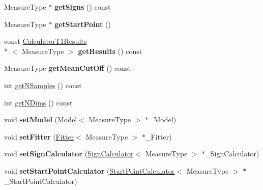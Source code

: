 \begin{DoxyCompactItemize}
\item 
\hypertarget{class_ox_1_1_calculator_ac05783e37c8e6f3f457778ebbfa2e6a5}{Measure\-Type $\ast$ {\bfseries get\-Signs} () const }\label{class_ox_1_1_calculator_ac05783e37c8e6f3f457778ebbfa2e6a5}

\item 
\hypertarget{class_ox_1_1_calculator_aebf55897e1f11cdd3afec75d24c8ea13}{Measure\-Type $\ast$ {\bfseries get\-Start\-Point} ()}\label{class_ox_1_1_calculator_aebf55897e1f11cdd3afec75d24c8ea13}

\item 
\hypertarget{class_ox_1_1_calculator_a98d3b018916c58f01f200085f20c219f}{const \hyperlink{struct_ox_1_1_calculator_t1_results}{Calculator\-T1\-Results}\\*
$<$ Measure\-Type $>$ {\bfseries get\-Results} () const }\label{class_ox_1_1_calculator_a98d3b018916c58f01f200085f20c219f}

\item 
\hypertarget{class_ox_1_1_calculator_a8232921e636ebc91a102bc2e95596a7b}{Measure\-Type {\bfseries get\-Mean\-Cut\-Off} () const }\label{class_ox_1_1_calculator_a8232921e636ebc91a102bc2e95596a7b}

\item 
int \hyperlink{class_ox_1_1_calculator_a5e5b6e1af84b8713c833a25d7c0dd90d}{get\-N\-Samples} () const 
\item 
int \hyperlink{class_ox_1_1_calculator_a3a4266dedca7e02707e732a312b85048}{get\-N\-Dims} () const 
\item 
\hypertarget{class_ox_1_1_calculator_ab814b8876ab6ddd7585f73dd23024624}{void {\bfseries set\-Model} (\hyperlink{class_ox_1_1_model}{Model}$<$ Measure\-Type $>$ $\ast$\-\_\-\-Model)}\label{class_ox_1_1_calculator_ab814b8876ab6ddd7585f73dd23024624}

\item 
\hypertarget{class_ox_1_1_calculator_a65d901e63b2f59b77a7dea82eaaa8215}{void {\bfseries set\-Fitter} (\hyperlink{class_ox_1_1_fitter}{Fitter}$<$ Measure\-Type $>$ $\ast$\-\_\-\-Fitter)}\label{class_ox_1_1_calculator_a65d901e63b2f59b77a7dea82eaaa8215}

\item 
\hypertarget{class_ox_1_1_calculator_a9b29545ec9a0e911217f496f7d539471}{void {\bfseries set\-Sign\-Calculator} (\hyperlink{class_ox_1_1_sign_calculator}{Sign\-Calculator}$<$ Measure\-Type $>$ $\ast$\-\_\-\-Sign\-Calculator)}\label{class_ox_1_1_calculator_a9b29545ec9a0e911217f496f7d539471}

\item 
\hypertarget{class_ox_1_1_calculator_a1ea380bc76e9cd19f0a04254ae167230}{void {\bfseries set\-Start\-Point\-Calculator} (\hyperlink{class_ox_1_1_start_point_calculator}{Start\-Point\-Calculator}$<$ Measure\-Type $>$ $\ast$\-\_\-\-Start\-Point\-Calculator)}\label{class_ox_1_1_calculator_a1ea380bc76e9cd19f0a04254ae167230}


\end{DoxyCompactItemize}
